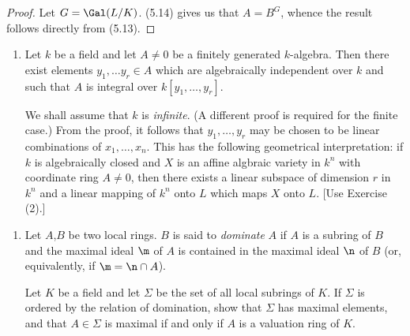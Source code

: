 \documentclass[12pt]{amsart}
\begin{document}
\begin{proof}
  Let $G=\Gal(L/K)$. 
  (5.14) gives us that $A=B^G$, whence the result follows directly from (5.13).
\end{proof}

\begin{enumerate}
	\item[5.16.] {
      Let $k$ be a field and let $A\neq 0$ be a finitely generated $k$-algebra.
      Then there exist elements $y_1,\ldots y_r\in A$ which are algebraically independent over $k$ and such that $A$ is integral over $k[y_1,\ldots, y_r]$.

      We shall assume that $k$ is \emph{infinite}. (A different proof is required for the finite case.)
      From the proof, it follows that $y_1,\ldots, y_r$ may be chosen to be linear combinations of $x_1,\ldots, x_n$.
      This has the following geometrical interpretation: if $k$ is algebraically closed and $X$ is an affine algbraic variety in $k^n$ with coordinate ring $A\neq 0$, then there exists a linear subspace of dimension $r$ in $k^n$ and a linear mapping of $k^n$ onto $L$ which maps $X$ onto $L$. [Use Exercise (2).]
    }
\end{enumerate}

\begin{enumerate}
  \item[5.27] {
      Let $A$,$B$ be two local rings.
      $B$ is said to \emph{dominate} $A$ if $A$ is a subring of $B$ and the maximal ideal $\m$ of $A$ is contained in the maximal ideal $\n$ of $B$ (or, equivalently, if $\m=\n\cap A$).

      Let $K$ be a field and let $\Sigma$ be the set of all local subrings of $K$.
      If $\Sigma$ is ordered by the relation of domination, show that $\Sigma$ has maximal elements, and that $A\in \Sigma$ is maximal if and only if $A$ is a valuation ring of $K$.
    }
\end{enumerate}
\end{document}
